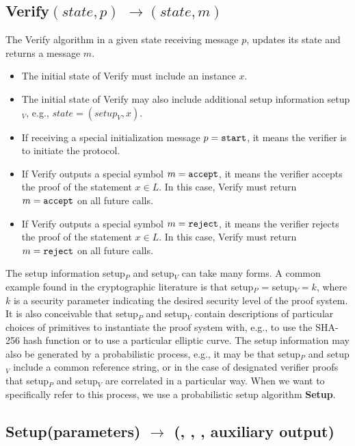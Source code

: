 \subsection[Verify]{\textbf{Verify}$(state, p)$ $\rightarrow (state, m)$}

The Verify algorithm in a given state receiving message $p$, updates its state and returns a message $m$.\loosen

\begin{itemize}
\item The initial state of Verify must include an instance $x$.
\item The initial state of Verify may also include additional setup information setup$_V$, e.g., $state = (setup_V,x)$.
\item If receiving a special initialization message $p = \tt start$, it means the verifier is to initiate the protocol.
\item If Verify outputs a special symbol $m = \tt accept$, it means the verifier accepts the proof of the statement $x \in L$. 
			In this case, Verify must return $m = \tt accept$ on all future calls.
\item If Verify outputs a special symbol $m = \tt reject$, it means the verifier rejects the proof of the statement $x \in L$. 
			In this case, Verify must return $m = \tt reject$ on all future calls.
\end{itemize}
 
	The setup information setup$_P$ and setup$_V$ can take many forms. 
	A common example found in the cryptographic literature is that setup$_P$ = setup$_V = k$, 
where $k$ is a security parameter indicating the desired security level of the proof system. 
	It is also conceivable that setup$_P$ and setup$_V$ contain descriptions of particular choices of primitives to instantiate the proof system with, e.g., to use the SHA-256 hash function or to use a particular elliptic curve. 
	The setup information may also be generated by a probabilistic process, e.g., 
it may be that setup$_P$ and setup$_V$ include a common reference string, 
or in the case of designated verifier proofs that setup$_P$ and setup$_V$ are correlated in a particular way. 
	When we want to specifically refer to this process, we use a probabilistic setup algorithm \textbf{Setup}.


\subsection[Setup]{\textbf{Setup}(parameters) 
$\rightarrow$ (\setR, \setP, \setV, auxiliary output)}

